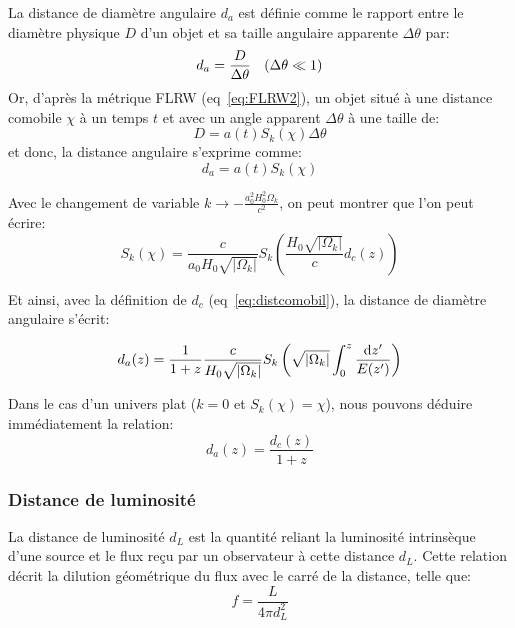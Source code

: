 \documentclass[../main/main.tex]{subfiles}
\begin{document}
La distance de diamètre angulaire $d_{a}$ est définie comme le rapport entre le
diamètre physique $D$ d'un objet et sa taille angulaire apparente
$\Delta\theta$ par:
\begin{equation}
  \label{eq:angulardist1}
  d_{a}=\frac{D}{\Delta\theta} \text{ \; ($\Delta\theta\ll1$)}
\end{equation}
Or, d'après la métrique FLRW (eq~\ref{eq:FLRW2}), un objet situé à une
distance comobile $\chi$ à un temps $t$ et avec un angle apparent
$\Delta\theta$ à une taille de:
\begin{equation}
  \label{eq:tailleangulardist}
  D = a(t)S_{k}(\chi)\Delta\theta
\end{equation}
et donc, la distance angulaire s'exprime comme:
\begin{equation}
  \label{eq:angulardist2}
  d_{a}=a(t)S_{k}(\chi)
\end{equation}

Avec le changement de variable $k\rightarrow
-\frac{a_{0}^{2}H_{0}^{2}\Omega_{k}}{c^{2}}$, on peut montrer que l'on
peut écrire:
\begin{equation}
  \label{eq:43}
  S_{k}(\chi) = \frac{c}{a_{0}H_{0}\sqrt{\lvert\Omega_{k}\rvert}}S_{k}\left(\frac{H_{0}\sqrt{\lvert\Omega_{k}\rvert}}{c}d_{c}(z)\right)
\end{equation}

Et ainsi, avec la définition de $d_{c}$ (eq~\ref{eq:distcomobil}), la
distance de diamètre angulaire s'écrit:

\begin{equation}
  \label{eq:distangulargen}
  d_{a}(z)=\frac{1}{1+z}\frac{c}{H_{0}\sqrt{\lvert\Omega_{k}\rvert}}S_{k}\left(\sqrt{\lvert\Omega_{k}\rvert}\int_{0}^{z}\frac{\mathrm{d} z'}{E(z')}\right)
\end{equation}

Dans le cas d'un univers plat ($k=0$ et $S_{k}(\chi)=\chi$), nous
pouvons déduire immédiatement la relation:
\begin{equation}
  \label{eq:angulardistflat}
  d_{a}(z)=\frac{d_{c}(z)}{1+z}
\end{equation}


\subsubsection*{Distance de luminosité}

La distance de luminosité $d_{L}$ est la quantité reliant la luminosité
intrinsèque d'une source et le flux reçu par un observateur à cette
distance $d_{L}$. Cette relation décrit la dilution géométrique du flux
avec le carré de la distance, telle que:
\begin{equation}
  \label{eq:45}
  f=\frac{L}{4\pi d_{L}^{2}}
\end{equation}
\end{document}
